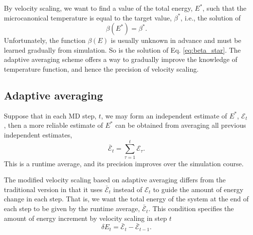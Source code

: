 \documentclass[reprint]{revtex4-1}
\begin{document}
By velocity scaling, we want to
find a value of the total energy, $E^*$,
such that the microcanonical temperature
is equal to the target value, $\beta^*$,
i.e., the solution of
%
\begin{equation}
  \beta(E^*)
  =
  \beta^*
  .
  \label{eq:beta_star}
\end{equation}
%
Unfortunately, the function $\beta(E)$
is usually unknown in advance
and must be learned gradually from simulation.
%
So is the solution of Eq. \eqref{eq:beta_star}.
%
The adaptive averaging scheme offers a way
to gradually improve the knowledge of temperature function,
and hence the precision of velocity scaling.



\subsection{Adaptive averaging}



Suppose that in each MD step, $t$,
we may form an independent estimate of $E^*$,
$\mathcal E_t$,
then a more reliable estimate of $E^*$
can be obtained from averaging
all previous independent estimates,
%
\begin{equation}
  \bar{\mathcal E}_t
  =
  \sum_{\tau = 1}^t
    \mathcal E_\tau
  .
  \label{eq:Epsave}
\end{equation}
%
This is a runtime average,
and its precision improves over the simulation course.


The modified velocity scaling based on adaptive averaging
differs from the traditional version
in that it uses $\bar{\mathcal E}_t$
instead of $\mathcal E_t$
to guide the amount of energy change in each step.
%
That is, we want
the total energy of the system
at the end of each step
to be given by
the runtime average, $\bar{\mathcal E}_t$.
%
This condition specifies the amount of energy increment
by velocity scaling in step $t$
%
\begin{equation}
  \delta E_t
  =
  \bar{\mathcal E}_t - \bar{\mathcal E}_{t - 1}
  .
  \label{eq:dE_adaptive}
\end{equation}
\end{document}
